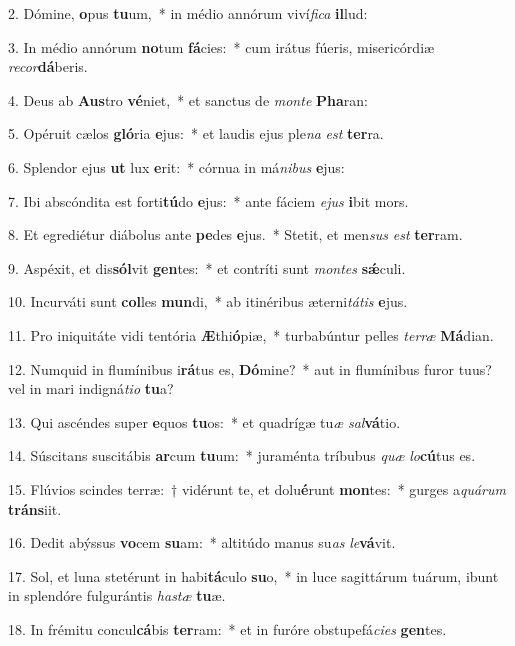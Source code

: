 ﻿2. Dómine, \textbf{o}pus \textbf{tu}um,~* in médio annórum viví\textit{fi}\textit{ca} \textbf{il}lud:

3. In médio annórum \textbf{no}tum \textbf{fá}cies:~* cum irátus fúeris, misericórdiæ \textit{re}\textit{cor}\textbf{dá}beris.

4. Deus ab \textbf{Aus}tro \textbf{vé}niet,~* et sanctus de \textit{mon}\textit{te} \textbf{Pha}ran:

5. Opéruit cælos \textbf{gló}ria \textbf{e}jus:~* et laudis ejus ple\textit{na} \textit{est} \textbf{ter}ra.

6. Splendor ejus \textbf{ut} lux \textbf{e}rit:~* córnua in má\textit{ni}\textit{bus} \textbf{e}jus:

7. Ibi abscóndita est forti\textbf{tú}do \textbf{e}jus:~* ante fáciem \textit{e}\textit{jus} \textbf{i}bit mors.

8. Et egrediétur diábolus ante \textbf{pe}des \textbf{e}jus.~* Stetit, et men\textit{sus} \textit{est} \textbf{ter}ram.

9. Aspéxit, et dis\textbf{sól}vit \textbf{gen}tes:~* et contríti sunt \textit{mon}\textit{tes} \textbf{sǽ}culi.

10. Incurváti sunt \textbf{col}les \textbf{mun}di,~* ab itinéribus æterni\textit{tá}\textit{tis} \textbf{e}jus.

11. Pro iniquitáte vidi tentória \textbf{Æ}thi\textbf{ó}piæ,~* turbabúntur pelles \textit{ter}\textit{ræ} \textbf{Má}dian.

12. Numquid in flumínibus i\textbf{rá}tus es, \textbf{Dó}mine?~* aut in flumínibus furor tuus? vel in mari indigná\textit{ti}\textit{o} \textbf{tu}a?

13. Qui ascéndes super \textbf{e}quos \textbf{tu}os:~* et quadrígæ tu\textit{æ} \textit{sal}\textbf{vá}tio.

14. Súscitans suscitábis \textbf{ar}cum \textbf{tu}um:~* juraménta tríbubus \textit{quæ} \textit{lo}\textbf{cú}tus es.

15. Flúvios scindes terræ:~† vidérunt te, et dolu\textbf{é}runt \textbf{mon}tes:~* gurges a\textit{quá}\textit{rum} \textbf{tráns}iit.

16. Dedit abýssus \textbf{vo}cem \textbf{su}am:~* altitúdo manus su\textit{as} \textit{le}\textbf{vá}vit.

17. Sol, et luna stetérunt in habi\textbf{tá}culo \textbf{su}o,~* in luce sagittárum tuárum, ibunt in splendóre fulgurántis \textit{has}\textit{tæ} \textbf{tu}æ.

18. In frémitu concul\textbf{cá}bis \textbf{ter}ram:~* et in furóre obstupefá\textit{ci}\textit{es} \textbf{gen}tes.


